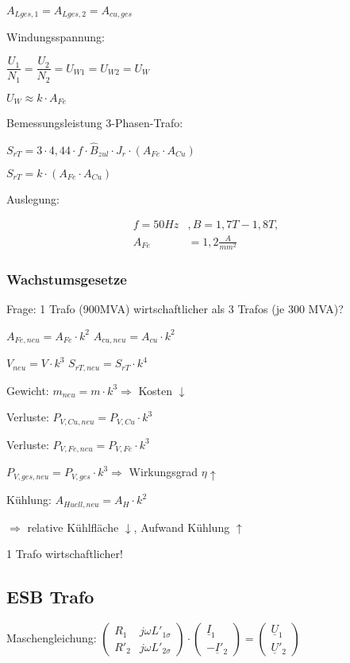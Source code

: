 \documentclass[a4paper,11pt]{article}
\begin{document}
	$A_{Lges,1} = A_{Lges,2} = A_{cu,ges} $

	Windungsspannung:

	$\dfrac{U_{1}}{N_{1}} = \dfrac{U_{2}}{N_{2}} = U_{W1} = U_{W2} = U_{W}$

	$U_{W} \approx k \cdot A_{Fe}$

	Bemessungsleistung 3-Phasen-Trafo:

	$S_{rT} = 3 \cdot 4,44 \cdot f \cdot \hat{B}_{zul} \cdot J_{r} \cdot (A_{Fe} \cdot A_{Cu})$

	$S_{rT} = k \cdot (A_{Fe} \cdot A_{Cu})$

	Auslegung:

    \begin{align*}
        f = 50Hz &, B = 1,7 T - 1,8 T,\\ A_{Fe} &= 1,2 \frac{A}{mm^{2}}
    \end{align*}

	\subsubsection{Wachstumsgesetze}

	Frage: 1 Trafo (900MVA) wirtschaftlicher als 3 Trafos (je 300 MVA)?

	$A_{Fe,neu} = A_{Fe} \cdot k^2$ \quad $A_{cu,neu} = A_{cu} \cdot k^2$ \quad

	$V_{neu} = V \cdot k^3$ \quad $S_{rT,neu} = S_{rT} \cdot k^4$

	Gewicht: $m_{neu} = m \cdot k^3 \Rightarrow$ Kosten $\downarrow$

	Verluste: $P_{V,Cu,neu} = P_{V,Cu} \cdot k^3$

	Verluste: $P_{V,Fe,neu} = P_{V,Fe} \cdot k^3$

	$P_{V,ges,neu} = P_{V,ges} \cdot k^3 \Rightarrow$ Wirkungsgrad $\eta \uparrow$

	Kühlung: $A_{Huell,neu} = A_H \cdot k^2$

	$\Rightarrow$ relative Kühlfläche $\downarrow$, Aufwand Kühlung $\uparrow$

	1 Trafo wirtschaftlicher!

	\subsection{ESB Trafo}

	Maschengleichung:
	$
	\begin{pmatrix}
		R_{1} & j\omega L'_{1\sigma} \\
		R'_{2} & j\omega L'_{2\sigma}
	\end{pmatrix} \cdot
	\begin{pmatrix}
		\underline{I}_{1} \\
		-\underline{I}'_{2}
	\end{pmatrix} =
	\begin{pmatrix}
		\underline{U}_{1} \\
		\underline{U}'_{2}
	\end{pmatrix}
	$
\end{document}
